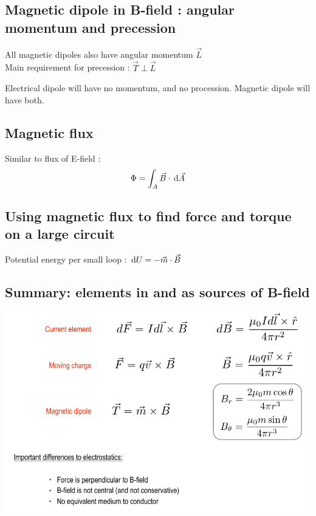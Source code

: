 \documentclass[12pt,a4paper]{article}
\begin{document}
\subsection{}
\subsection[Mag. dipole : and. momentum, precession]{Magnetic dipole in B-field : angular momentum and precession}
All magnetic dipoles also have angular momentum $\vec{L}$\\
Main requirement for precession : $\vec{T} \perp \vec{L}$

Electrical dipole will have no momentum, and no procession. Magnetic dipole will have both.

\subsection*{Magnetic flux}
Similar to flux of E-field :
\begin{equation}
	\Phi = \int_A \vec{B} \cdot \, \mathrm d \vec{A}
\end{equation}

\subsection*{Using magnetic flux to find force and torque on a large circuit}
Potential energy per small loop : $\, \mathrm d U = -\vec{m} \cdot \vec{B}$

\subsection{Summary: elements in and as sources of B-field}
\includegraphics[scale=0.7]{images/summary_b-field}
\end{document}

